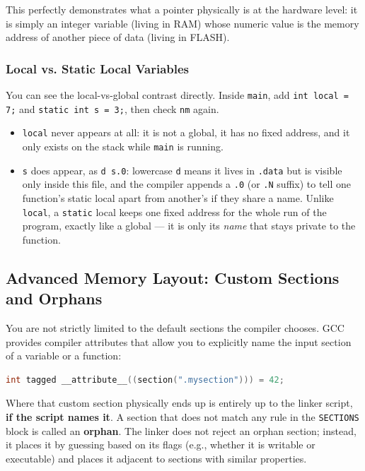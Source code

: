 This perfectly demonstrates what a pointer physically is at the hardware level: it is simply an integer variable (living in RAM) whose numeric value is the memory address of another piece of data (living in FLASH).

\subsubsection{Local vs. Static Local Variables}
You can see the local-vs-global contrast directly. Inside \texttt{main}, add \texttt{int local = 7;} and \texttt{static int s = 3;}, then check \texttt{nm} again.
\begin{itemize}
    \item \texttt{local} never appears at all: it is not a global, it has no fixed address, and it only exists on the stack while \texttt{main} is running.
    \item \texttt{s} does appear, as \texttt{d s.0}: lowercase \texttt{d} means it lives in \texttt{.data} but is visible only inside this file, and the compiler appends a \texttt{.0} (or \texttt{.N} suffix) to tell one function's static local apart from another's if they share a name. Unlike \texttt{local}, a \texttt{static} local keeps one fixed address for the whole run of the program, exactly like a global — it is only its \textit{name} that stays private to the function.
\end{itemize}

\subsection{Advanced Memory Layout: Custom Sections and Orphans}
You are not strictly limited to the default sections the compiler chooses. GCC provides compiler attributes that allow you to explicitly name the input section of a variable or a function:

\begin{lstlisting}[language=c]
int tagged __attribute__((section(".mysection"))) = 42;
\end{lstlisting}

Where that custom section physically ends up is entirely up to the linker script, \textbf{if the script names it}. A section that does not match any rule in the \texttt{SECTIONS} block is called an \textbf{orphan}. The linker does not reject an orphan section; instead, it places it by guessing based on its flags (e.g., whether it is writable or executable) and places it adjacent to sections with similar properties. 


